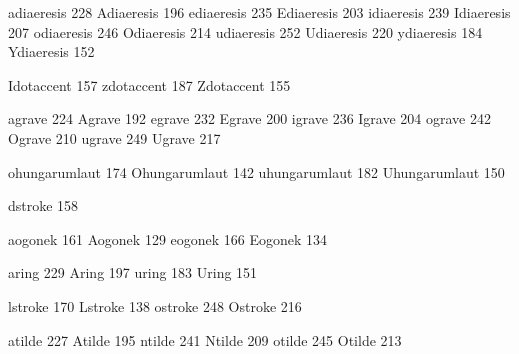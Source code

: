  adiaeresis      228
 Adiaeresis      196
 ediaeresis      235
 Ediaeresis      203
 idiaeresis      239
 Idiaeresis      207
 odiaeresis      246
 Odiaeresis      214
 udiaeresis      252
 Udiaeresis      220
 ydiaeresis      184
 Ydiaeresis      152

 Idotaccent      157
 zdotaccent      187
 Zdotaccent      155

 agrave          224
 Agrave          192
 egrave          232
 Egrave          200
 igrave          236
 Igrave          204
 ograve          242
 Ograve          210
 ugrave          249
 Ugrave          217

 ohungarumlaut   174
 Ohungarumlaut   142
 uhungarumlaut   182
 Uhungarumlaut   150

 dstroke         158

 aogonek         161
 Aogonek         129
 eogonek         166
 Eogonek         134

 aring           229
 Aring           197
 uring           183
 Uring           151

 lstroke         170
 Lstroke         138
 ostroke         248
 Ostroke         216

 atilde          227
 Atilde          195
 ntilde          241
 Ntilde          209
 otilde          245
 Otilde          213

\stopencoding

\endinput
